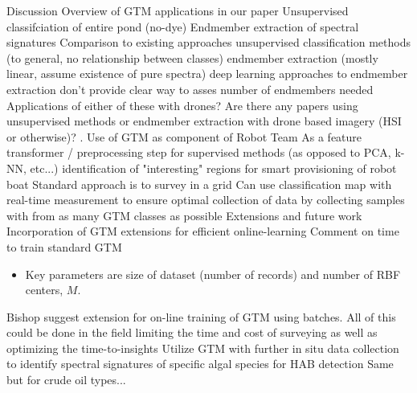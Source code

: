 \documentclass{article}
\begin{document}
\begin{outline}[enumerate]
\1 Discussion
    \2 Overview of GTM applications in our paper
        \3 Unsupervised classifciation of entire pond (no-dye)
        \3 Endmember extraction of spectral signatures
    \2 Comparison to existing approaches
        \3 unsupervised classification methods (to general, no relationship between classes) 
        \3 endmember extraction (mostly linear, assume existence of pure spectra)
        \3 deep learning approaches to endmember extraction don't provide clear way to asses number of endmembers needed
    \2 Applications of either of these with drones?
        \3 Are there any papers using unsupervised methods or endmember extraction with drone based imagery (HSI or otherwise)?
    \2. Use of GTM as component of Robot Team
        \3 As a feature transformer / preprocessing step for supervised methods (as opposed to PCA, k-NN, etc...)
        \3 identification of "interesting" regions for smart provisioning of robot boat
            \4 Standard approach is to survey in a grid
            \4 Can use classification map with real-time measurement to ensure optimal collection of data by collecting samples with from as many GTM classes as possible
    \2 Extensions and future work
        \3 Incorporation of GTM extensions for efficient online-learning
            \4 Comment on time to train standard GTM
                \begin{itemize}
                    \item Key parameters are size of dataset (number of records) and number of RBF centers, $M$.
                \end{itemize}
            \4 Bishop suggest extension for on-line training of GTM using batches.
            \4 All of this could be done in the field limiting the time and cost of surveying as well as optimizing the time-to-insights
        \3 Utilize GTM with further in situ data collection to identify spectral signatures of specific algal species for HAB detection
        \3 Same but for crude oil types...
\end{outline}



\end{document}

